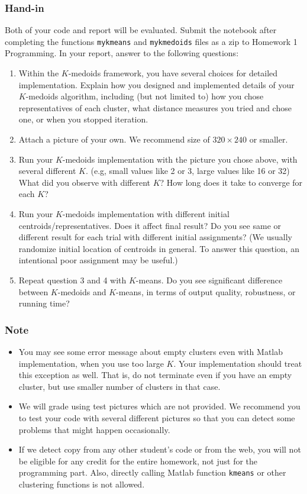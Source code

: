 \documentclass[twoside,10pt]{article}
\begin{document}
\subsubsection*{Hand-in}
Both of your code and report will be evaluated. Submit the notebook after completing the functions \texttt{mykmeans} and \texttt{mykmedoids} files as a zip to Homework 1 Programming. In your report, answer to the following questions:
\begin{enumerate}
  \item Within the $K$-medoids framework, you have several choices for detailed implementation. Explain how you designed and implemented details of your $K$-medoids algorithm, including (but not limited to) how you chose representatives of each cluster, what distance measures you tried and chose one, or when you stopped iteration.
  \item Attach a picture of your own. We recommend size of $320 \times 240$ or smaller.
  \item Run your $K$-medoids implementation with the picture you chose above, with several different $K$. (e.g, small values like 2 or 3, large values like 16 or 32) What did you observe with different $K$? How long does it take to converge for each $K$?
  \item Run your $K$-medoids implementation with different initial centroids/representatives. Does it affect final result? Do you see same or different result for each trial with different initial assignments? (We usually randomize initial location of centroids in general. To answer this question, an intentional poor assignment may be useful.)
  \item Repeat question 3 and 4 with $K$-means. Do you see significant difference between $K$-medoids and $K$-means, in terms of output quality, robustness, or running time?
\end{enumerate}


\subsubsection*{Note}
\begin{itemize}
  \item You may see some error message about empty clusters even with Matlab implementation, when you use too large $K$. Your implementation should treat this exception as well. That is, do not terminate even if you have an empty cluster, but use smaller number of clusters in that case.

  \item We will grade using test pictures which are not provided. We recommend you to test your code with several different pictures so that you can detect some problems that might happen occasionally. 

  \item If we detect copy from any other student's code or from the web, you will not be eligible for any credit for the entire homework, not just for the programming part. Also, directly calling Matlab function \texttt{kmeans} or other clustering functions is not allowed.
\end{itemize}
\end{document}
